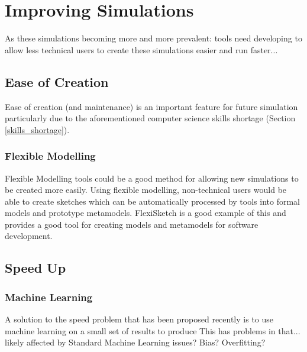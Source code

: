 \documentclass{UoYCSproject}
\begin{document}
\chapter{Improving Simulations}
\label{improvements}
As these simulations becoming more and more prevalent: tools need developing to allow less technical users to create these simulations easier and run faster...

\section{Ease of Creation}
Ease of creation (and maintenance) is an important feature for future simulation particularly due to the aforementioned computer science skills shortage (Section \ref{skills_shortage}).



\subsection{Flexible Modelling}
Flexible Modelling tools could be a good method for allowing new simulations to be created more easily. Using flexible modelling, non-technical users would be able to create sketches which can be automatically processed by tools into formal models and prototype metamodels\cite{Paige2017}. FlexiSketch is a good example of this and provides a good tool for creating models and metamodels for software development\cite{flexisketch}.

\section{Speed Up}

\subsection{Machine Learning}
A solution to the speed problem that has been proposed recently is to use machine learning on a small set of results to produce 
This has problems in that...
likely affected by Standard Machine Learning issues? Bias? Overfitting?
\end{document}
